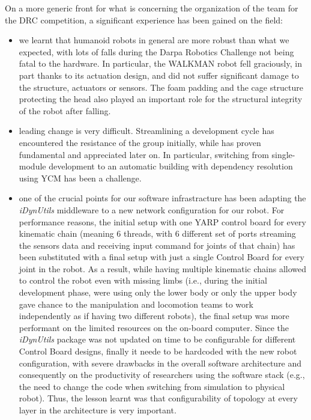 \documentclass[%
	paper=A4,					%
	twoside=true,				%
	openright,			.
	parskip=full,				%
	chapterprefix=true,			%
	11pt,						%
	headings=normal,			%
	bibliography=totoc,			%
	listof=totoc,				%
	titlepage=on,				%
	captions=tableabove,		%
	draft=true,				%
]{scrreprt}%
\begin{document}
On a more generic front for what is concerning the organization of the team for the DRC competition, a significant experience has been gained on the field:
\begin{itemize}
 \item we learnt that humanoid robots in general are more robust than what we expected, with lots of falls during the Darpa Robotics Challenge not being fatal to the hardware. In particular, the WALKMAN robot fell graciously, in part thanks to its actuation design, and did not suffer significant damage to the structure, actuators or sensors. The foam padding and the cage structure protecting the head also played an important role for the structural integrity of the robot after falling.
 \item leading change is very difficult. Streamlining a development cycle has encountered the resistance of the group initially, while has proven fundamental and appreciated later on. In particular, switching from single-module development to an automatic building with dependency resolution using YCM has been a challenge.
 \item one of the crucial points for our software infrastracture has been adapting the \emph{iDynUtils} middleware to a new network configuration for our robot. For performance reasons, the initial setup with one YARP control board for every kinematic chain (meaning 6 threads, with 6 different set of ports streaming the sensors data and receiving input command for joints of that chain) has been substituted with a final setup with just a single Control Board for every joint in the robot. As a result, while having multiple kinematic chains allowed to control the robot even with missing limbs (i.e., during the initial development phase, were using only the lower body or only the upper body gave chance to the manipulation and locomotion teams to work independently as if having two different robots), the final setup was more performant on the limited resources on the on-board computer. Since the \emph{iDynUtils} package was not updated on time to be configurable for different Control Board designs, finally it neede to be hardcoded with the new robot configuration, with severe drawbacks in the overall software architecture and consequently on the productivity of researchers using the software stack (e.g., the need to change the code when switching from simulation to physical robot). Thus, the lesson learnt was that configurability of topology at every layer in the architecture is very important.
\end{itemize}
\end{document}
